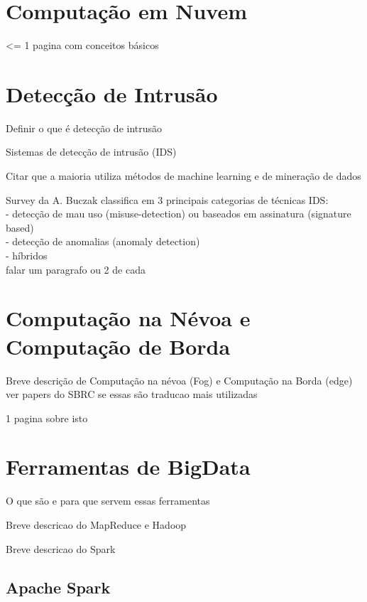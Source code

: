 \section{Computação em Nuvem} 

<= 1 pagina com conceitos básicos

\section{Detecção de Intrusão}

Definir o que é detecção de intrusão

Sistemas de detecção de intrusão (IDS) 

Citar que a maioria utiliza métodos de machine learning e de mineração de dados 

Survey da A. Buczak classifica em 3 principais categorias de técnicas IDS: \\
- detecção de mau uso (misuse-detection) ou baseados em assinatura (signature based)\\
- detecção de anomalias (anomaly detection)\\
- híbridos \\
falar um paragrafo ou 2 de cada

\section{Computação na Névoa e Computação de Borda}

Breve descrição de Computação na névoa (Fog) e Computação na Borda (edge) \\
ver papers do SBRC se essas são traducao mais utilizadas

1 pagina sobre isto


\section{Ferramentas de BigData}



O que são e para que servem essas ferramentas 

Breve descricao do MapReduce e Hadoop

Breve descricao do Spark 

\subsection{Apache Spark}


